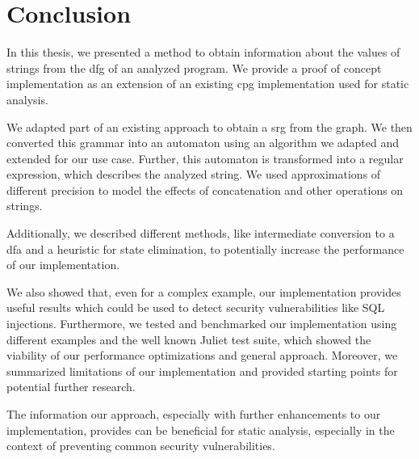 \chapter{Conclusion}\label{chapter:Conclusion}

In this thesis, we presented a method to obtain information about the values of strings from the \acl{dfg} of an analyzed program. We provide a proof of concept implementation as an extension of an existing \acl{cpg} implementation used for static analysis.

We adapted part of an existing approach to obtain a \acl{srg} from the graph. We then converted this grammar into an automaton using an algorithm we adapted and extended for our use case.
Further, this automaton is transformed into a regular expression, which describes the analyzed string. We used approximations of different precision to model the effects of concatenation and other operations on strings.

Additionally, we described different methods, like intermediate conversion to a \ac{dfa} and a heuristic for state elimination, to potentially increase the performance of our implementation.

We also showed that, even for a complex example, our implementation provides useful results which could be used to detect security vulnerabilities like SQL injections.
Furthermore, we tested and benchmarked our implementation using different examples and the well known Juliet test suite, which showed the viability of our performance optimizations and general approach.
Moreover, we summarized limitations of our implementation and provided starting points for potential further research.

The information our approach, especially with further enhancements to our implementation, provides can be beneficial for static analysis, especially in the context of preventing common security vulnerabilities.

\begin{comment}	
Summarize your main contributions and observations. Further research directions?

$\leq 1$ page
content...
\end{comment}